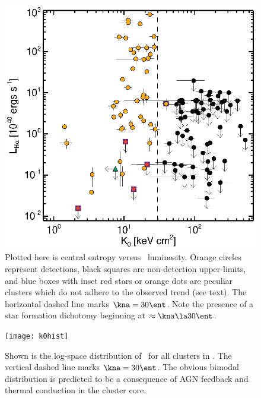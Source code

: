 \documentclass{emulateapj}
\begin{document}
\begin{figure}
  \begin{center}
    \includegraphics*[width=\columnwidth, trim=30mm 7mm 40mm 17mm, clip]{ha}
    \caption{Plotted here is central entropy versus \halpha\
      luminosity. Orange circles represent detections, black squares
      are non-detection upper-limits, and blue boxes with inset red
      stars or orange dots are peculiar clusters which do not adhere
      to the observed trend (see text). The horizontal dashed line
      marks $\kna = 30 \ent$. Note the presence of a star formation
      dichotomy beginning at $\approx \kna \la 30 \ent$.}
    \label{fig:ha}
  \end{center}
\end{figure}

\begin{figure}
  \begin{center}
    \centering
    \texttt{[image: k0hist]}
    \caption{Shown is the log-space distribution of \kna\ for all
      clusters in \accept. The vertical dashed line marks $\kna = 30
      \ent$. The obvious bimodal distribution is predicted to be a
      consequence of AGN feedback and thermal conduction in the
      cluster core.}
    \label{fig:k0hist}
  \end{center}
\end{figure}
\end{document}
